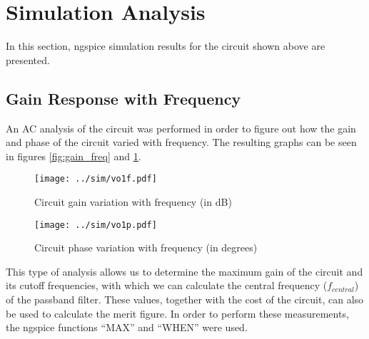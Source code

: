 \newpage
\section{Simulation Analysis}
\label{sec:simulation}

In this section, ngspice simulation results for the circuit shown above are presented.

\subsection{Gain Response with Frequency}

An AC analysis of the circuit was performed in order to figure out how the gain and phase of the circuit varied with frequency. The resulting graphs can be seen in figures \ref{fig:gain_freq} and \ref{fig:phase_freq}.


\begin{figure}[H]
\centering
\begin{minipage}[H]{0.45\linewidth}
{\texttt{[image: ../sim/vo1f.pdf]}}
\caption{Circuit gain variation with frequency (in dB)}
\label{fig:gain_freq}
\end{minipage}
\quad
\begin{minipage}[H]{0.45\linewidth}
\texttt{[image: ../sim/vo1p.pdf]}
\vspace{-4pt}
\caption{Circuit phase variation with frequency (in degrees)}
\label{fig:phase_freq}
\end{minipage}
\end{figure}




This type of analysis allows us to determine the maximum gain of the circuit and its cutoff frequencies, with which we can calculate the central frequency ($f_{central}$) of the passband filter. These values, together with the cost of the circuit, can also be used to calculate the merit figure. In order to perform these measurements, the ngspice functions ``MAX'' and ``WHEN'' were used.


